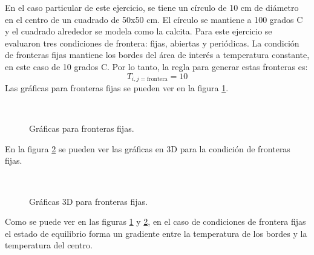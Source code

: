 \documentclass{article}
\begin{document}
En el caso particular de este ejercicio, se tiene un círculo de 10 cm de diámetro en el centro de un cuadrado de 50x50 cm. El círculo se mantiene a  100 grados C y el cuadrado alrededor se modela como la calcita. Para este ejercicio se evaluaron tres condiciones de frontera: fijas, abiertas y periódicas. La condición de fronteras fijas mantiene los bordes del área de interés a temperatura constante, en este caso de 10 grados C. Por lo tanto, la regla para generar estas fronteras es:
\begin{equation*}
    T_{i, j = \text{frontera}} = 10
\end{equation*}
Las gráficas para fronteras fijas se pueden ver en la figura \ref{fig:fijas}.
\begin{figure}[htbp]
\centering
     \\
    \caption{Gráficas para fronteras fijas.}
    \label{fig:fijas}
\end{figure}
En la figura \ref{fig:fijas3D} se pueden ver las gráficas en 3D para la condición de fronteras fijas.
\begin{figure}[htbp]
\centering
     \\
    \caption{Gráficas 3D para fronteras fijas.}
    \label{fig:fijas3D}
\end{figure}
Como se puede ver en las figuras \ref{fig:fijas} y \ref{fig:fijas3D}, en el caso de condiciones de frontera fijas el estado de equilibrio forma un gradiente entre la temperatura de los bordes y la temperatura del centro.
\end{document}
